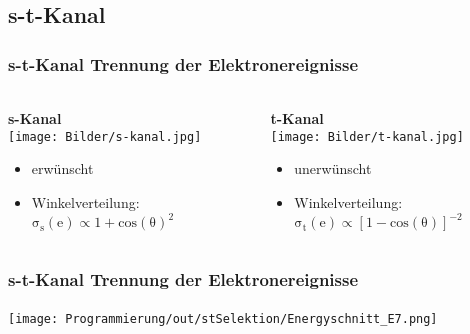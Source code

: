 \documentclass{beamer}
\begin{document}
\subsection{s-t-Kanal}

\begin{frame}
	\frametitle{s-t-Kanal Trennung der Elektronereignisse}
	\framesubtitle{}
	\begin{columns}
		\begin{column}{0.5\textwidth}
			\textbf{s-Kanal}\\
			\texttt{[image: Bilder/s-kanal.jpg]}
			\begin{itemize}
			 \item erwünscht
			 \item<2-> Winkelverteilung:\\
			 $\mathrm{\sigma_s(e)} \propto 1 + \mathrm{cos(\theta)}^2$ 
			\end{itemize}
		\end{column}
		\begin{column}{0.5\textwidth}
			\textbf{t-Kanal}\\
			\texttt{[image: Bilder/t-kanal.jpg]}
			\begin{itemize}
			 \item unerwünscht
			 \item<2-> Winkelverteilung:\\
			 $\mathrm{\sigma_t(e)} \propto [1 - \mathrm{cos(\theta)}]^{-2}$
			\end{itemize}
		\end{column}
	\end{columns}
	\vspace{3mm}
\end{frame}
\begin{frame}
	\frametitle{s-t-Kanal Trennung der Elektronereignisse}
	\framesubtitle{}
	\texttt{[image: Programmierung/out/stSelektion/Energyschnitt\_E7.png]}
\end{frame}
\end{document}
